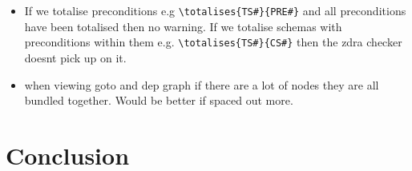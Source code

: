 \begin{itemize}
\item If we totalise preconditions e.g \verb|\totalises{TS#}{PRE#}| and all preconditions have been totalised then no warning. If we totalise schemas with preconditions within them e.g. \verb|\totalises{TS#}{CS#}| then the \gls{zdra} checker doesnt pick up on it.

\item when viewing goto and dep graph if there are a lot of nodes they are all bundled together. Would be better if spaced out more.
\end{itemize}

\section{Conclusion}

